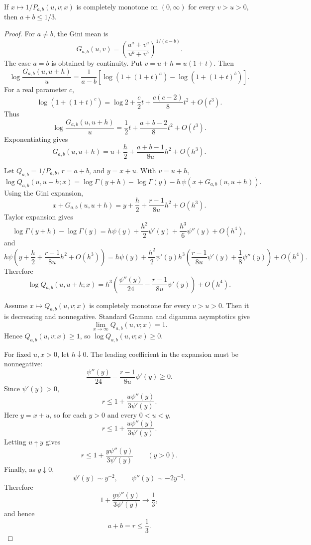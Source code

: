 \begin{proposition}
\label{res:ab-reciprocal-sum-gate-a-plus-b-le-one-third}
If \(x\mapsto1/P_{a,b}(u,v;x)\) is completely monotone on \((0,\infty)\) for every \(v>u>0\), then \(a+b\le1/3\).
\end{proposition}
\begin{proof}
For \(a\ne b\), the Gini mean is
\[
G_{a,b}(u,v)
=\left(\frac{u^a+v^a}{u^b+v^b}\right)^{1/(a-b)}.
\]
The case \(a=b\) is obtained by continuity. Put \(v=u+h=u(1+t)\). Then
\[
\log \frac{G_{a,b}(u,u+h)}{u}
=\frac{1}{a-b}
\left[
\log(1+(1+t)^a)-\log(1+(1+t)^b)
\right].
\]
For a real parameter \(c\),
\[
\log(1+(1+t)^c)
=\log2+\frac c2t+\frac{c(c-2)}8t^2+O(t^3).
\]
Thus
\[
\log \frac{G_{a,b}(u,u+h)}{u}
=\frac12t+\frac{a+b-2}{8}t^2+O(t^3).
\]
Exponentiating gives
\[
G_{a,b}(u,u+h)
=u+\frac h2+\frac{a+b-1}{8u}h^2+O(h^3).
\]

Let \(Q_{a,b}=1/P_{a,b}\), \(r=a+b\), and \(y=x+u\). With \(v=u+h\),
\[
\log Q_{a,b}(u,u+h;x)
=\log\Gamma(y+h)-\log\Gamma(y)
-h\,\psi(x+G_{a,b}(u,u+h)).
\]
Using the Gini expansion,
\[
x+G_{a,b}(u,u+h)
=y+\frac h2+\frac{r-1}{8u}h^2+O(h^3).
\]
Taylor expansion gives
\[
\log\Gamma(y+h)-\log\Gamma(y)
=h\psi(y)+\frac{h^2}{2}\psi'(y)+\frac{h^3}{6}\psi''(y)+O(h^4),
\]
and
\[
h\psi\left(y+\frac h2+\frac{r-1}{8u}h^2+O(h^3)\right)
=h\psi(y)+\frac{h^2}{2}\psi'(y)
h^3\left(\frac{r-1}{8u}\psi'(y)+\frac18\psi''(y)\right)+O(h^4).
\]
Therefore
\[
\log Q_{a,b}(u,u+h;x)
=h^3\left(
\frac{\psi''(y)}{24}
-\frac{r-1}{8u}\psi'(y)
\right)+O(h^4).
\]

Assume \(x\mapsto Q_{a,b}(u,v;x)\) is completely monotone for every \(v>u>0\). Then it is decreasing and nonnegative. Standard Gamma and digamma asymptotics give
\[
\lim_{x\to\infty}Q_{a,b}(u,v;x)=1.
\]
Hence \(Q_{a,b}(u,v;x)\ge1\), so \(\log Q_{a,b}(u,v;x)\ge0\).

For fixed \(u,x>0\), let \(h\downarrow0\). The leading coefficient in the expansion must be nonnegative:
\[
\frac{\psi''(y)}{24}
-\frac{r-1}{8u}\psi'(y)
\ge0.
\]
Since \(\psi'(y)>0\),
\[
r\le 1+\frac{u\psi''(y)}{3\psi'(y)}.
\]
Here \(y=x+u\), so for each \(y>0\) and every \(0<u<y\),
\[
r\le 1+\frac{u\psi''(y)}{3\psi'(y)}.
\]
Letting \(u\uparrow y\) gives
\[
r\le 1+\frac{y\psi''(y)}{3\psi'(y)}
\qquad (y>0).
\]
Finally, as \(y\downarrow0\),
\[
\psi'(y)\sim y^{-2},
\qquad
\psi''(y)\sim -2y^{-3}.
\]
Therefore
\[
1+\frac{y\psi''(y)}{3\psi'(y)}\to \frac13,
\]
and hence
\[
a+b=r\le \frac13.
\]
\end{proof}

